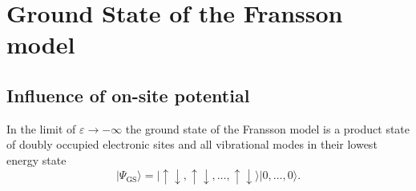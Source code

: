 \documentclass{article}
\begin{document}
%
\section{Ground State of the Fransson model}
\subsection{Influence of on-site potential}
In the limit of $\varepsilon\rightarrow-\infty$ the ground state of the Fransson model is a product state of doubly occupied electronic sites and all vibrational modes in their lowest energy state
\begin{equation}
	\vert \Psi_\mathrm{GS}\rangle = \vert \uparrow\downarrow,\uparrow\downarrow,\dots,\uparrow\downarrow\rangle\vert 0,\dots,0\rangle.
\end{equation}
\end{document}
